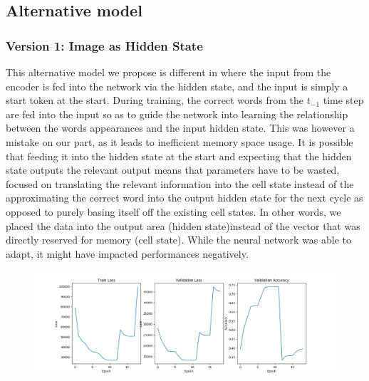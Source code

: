 \documentclass{proc}
\begin{document}
\subsection{Alternative model}
\subsubsection{Version 1: Image as Hidden State}
This alternative model we propose is different in where the input from the encoder is fed into the network via the hidden state, and the input is simply a start token at the start. During training, the correct words from the $t_{-1}$ time step are fed into the input so as to guide the network into learning the relationship between the words appearances and the input hidden state. This was however a mistake on our part, as it leads to inefficient memory space usage. It is possible that feeding it into the hidden state at the start and expecting that the hidden state outputs the relevant output means that parameters have to be wasted, focused on translating the relevant information into the cell state instead of the approximating the correct word into the output hidden state for the next cycle as opposed to purely basing itself off the existing cell states. In other words, we placed the data into the output area (hidden state)instead of the vector that was directly reserved for memory (cell state). While the neural network was able to adapt, it might have impacted performances negatively.
\begin{figure}[h!]
  \includegraphics[width=\linewidth]{image_as_hidden.png}
\end{figure}
\end{document}
